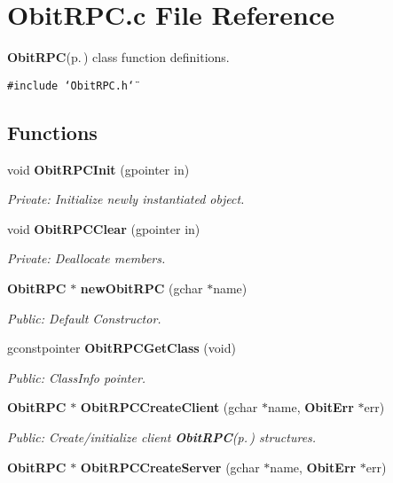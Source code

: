 \section{Obit\-RPC.c File Reference}
\label{ObitRPC_8c}
{\bf Obit\-RPC}{\rm (p.\,\pageref{structObitRPC})} class function definitions. 

{\tt \#include \char`\"{}Obit\-RPC.h\char`\"{}}\par
\subsection*{Functions}
\begin{CompactItemize}
\item 
void {\bf Obit\-RPCInit} (gpointer in)
\begin{CompactList}\small\item\em Private: Initialize newly instantiated object. \item\end{CompactList}\item 
void {\bf Obit\-RPCClear} (gpointer in)
\begin{CompactList}\small\item\em Private: Deallocate members. \item\end{CompactList}\item 
{\bf Obit\-RPC} $\ast$ {\bf new\-Obit\-RPC} (gchar $\ast$name)
\begin{CompactList}\small\item\em Public: Default Constructor. \item\end{CompactList}\item 
gconstpointer {\bf Obit\-RPCGet\-Class} (void)
\begin{CompactList}\small\item\em Public: Class\-Info pointer. \item\end{CompactList}\item 
{\bf Obit\-RPC} $\ast$ {\bf Obit\-RPCCreate\-Client} (gchar $\ast$name, {\bf Obit\-Err} $\ast$err)
\begin{CompactList}\small\item\em Public: Create/initialize client {\bf Obit\-RPC}{\rm (p.\,\pageref{structObitRPC})} structures. \item\end{CompactList}\item 
{\bf Obit\-RPC} $\ast$ {\bf Obit\-RPCCreate\-Server} (gchar $\ast$name, {\bf Obit\-Err} $\ast$err)

\end{CompactItemize}
